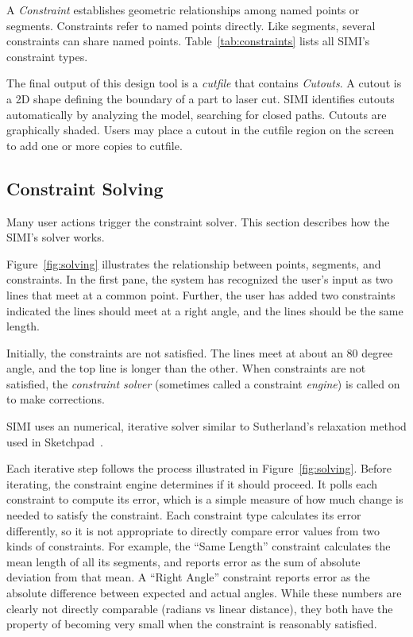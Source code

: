 A \textit{Constraint} establishes geometric relationships among named
points or segments. Constraints refer to named points directly. Like
segments, several constraints can share named
points. Table~\ref{tab:constraints} lists all SIMI's constraint types.


The final output of this design tool is a \textit{cutfile} that
contains \textit{Cutouts}. A cutout is a 2D shape defining the
boundary of a part to laser cut. SIMI identifies cutouts automatically
by analyzing the model, searching for closed paths. Cutouts are
graphically shaded. Users may place a cutout in the cutfile region on
the screen to add one or more copies to cutfile.

\subsection{Constraint Solving}

Many user actions trigger the constraint solver. This section
describes how the SIMI's solver works.

Figure~\ref{fig:solving} illustrates the relationship between points,
segments, and constraints. In the first pane, the system has
recognized the user's input as two lines that meet at a common
point. Further, the user has added two constraints indicated the lines
should meet at a right angle, and the lines should be the same length.

Initially, the constraints are not satisfied. The lines meet at about
an 80 degree angle, and the top line is longer than the other. When
constraints are not satisfied, the \textit{constraint solver}
(sometimes called a constraint \textit{engine}) is called on to make
corrections.

SIMI uses an numerical, iterative solver similar to Sutherland's
relaxation method used in Sketchpad~\cite{sutherland-sketchpad}. 

Each iterative step follows the process illustrated in
Figure~\ref{fig:solving}. Before iterating, the constraint engine
determines if it should proceed. It polls each constraint to compute
its error, which is a simple measure of how much change is needed to
satisfy the constraint. Each constraint type calculates its error
differently, so it is not appropriate to directly compare error values
from two kinds of constraints. For example, the ``Same Length''
constraint calculates the mean length of all its segments, and reports
error as the sum of absolute deviation from that mean. A ``Right
Angle'' constraint reports error as the absolute difference between
expected and actual angles. While these numbers are clearly not
directly comparable (radians vs linear distance), they both have the
property of becoming very small when the constraint is reasonably
satisfied.

